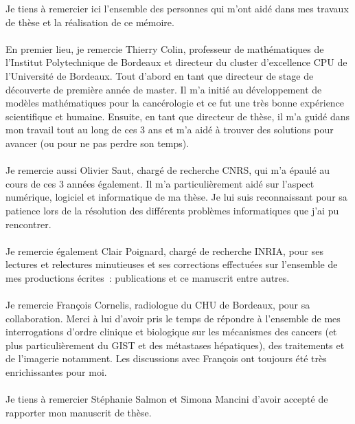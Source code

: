 Je tiens à remercier ici l'ensemble des personnes qui m'ont aidé dans mes travaux de thèse et la réalisation de ce mémoire.

\paragraph{}
En premier lieu, je remercie Thierry Colin, professeur de mathématiques de l'Institut Polytechnique de Bordeaux et directeur du cluster d'excellence CPU de l'Université de Bordeaux. Tout d'abord en tant que directeur de stage de découverte de première année de master. Il m'a initié au développement de modèles mathématiques pour la cancérologie et ce fut une très bonne expérience scientifique et humaine. Ensuite, en tant que directeur de thèse, il m'a guidé dans mon travail tout au long de ces 3 ans et m'a aidé à trouver des solutions pour avancer (ou pour ne pas perdre son temps). 

\paragraph{}
Je remercie aussi Olivier Saut, chargé de recherche CNRS, qui m'a épaulé au cours de ces 3 années également. Il m'a particulièrement aidé sur l'aspect numérique, logiciel et informatique de ma thèse. Je lui suis reconnaissant pour sa patience lors de la résolution des différents problèmes informatiques que j'ai pu rencontrer. 

\paragraph{}
Je remercie également Clair Poignard, chargé de recherche INRIA, pour ses lectures et relectures minutieuses et ses corrections effectuées sur l'ensemble de mes productions écrites~: publications et ce manuscrit entre autres.

\paragraph{}
Je remercie François Cornelis, radiologue du CHU de Bordeaux, pour sa collaboration. Merci à lui d'avoir pris le temps de répondre à l'ensemble de mes interrogations d'ordre clinique et biologique sur les mécanismes des cancers (et plus particulièrement du GIST et des métastases hépatiques), des traitements et de l'imagerie notamment. Les discussions avec François ont toujours été très enrichissantes pour moi. 

\paragraph{}
Je tiens à remercier Stéphanie Salmon et Simona Mancini d'avoir accepté de rapporter mon manuscrit de thèse.


